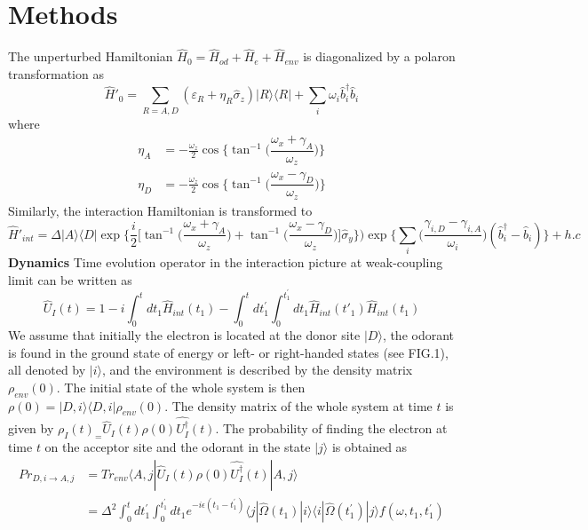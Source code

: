 \documentclass[aps,prl,tightenlines,onecolumn,superscriptaddress]{revtex4}
\begin{document}
\section{Methods}
 The unperturbed Hamiltonian $\hat H_{0}=\hat{H}_{od}+\hat{H}_{e}+\hat{H}_{env}$ is diagonalized by a polaron transformation as~\cite{Tir}
\begin{equation}\label{MI1}
\hat H'_{0}=\sum_{R=A,D}(\varepsilon_{R}+\eta_{R}\hat{\sigma}_{z})|R\rangle\langle R|+\sum_{i}\omega_{i}\hat b_{i}^{\dag}\hat b_{i}
\end{equation}
where
\begin{align}\label{MI2}
 \eta_{A}&=-\frac{\omega_{z}}{2}\cos\big\{\tan^{-1}\big(\dfrac{\omega_{x}+\gamma_{A}}{\omega_{z}}\big)\big\}\nonumber\\
 \eta_{D}&=-\frac{\omega_{z}}{2}\cos\big\{\tan^{-1}\big(\dfrac{\omega_{x}-\gamma_{D}}{\omega_{z}}\big)\big\}
\end{align}
Similarly, the interaction Hamiltonian is transformed to
\begin{equation}\label{MI3}
\hat H'_{int}=\Delta |A\rangle\langle D|\exp\Big\{\dfrac{i}{2}\big[\tan^{-1}\big(\dfrac{\omega_{x}+\gamma_{A}}{\omega_{z}}\big)+
\tan^{-1}\big(\dfrac{\omega_{x}-\gamma_{D}}{\omega_{z}}\big)\big]\hat\sigma_{y}\Big\})\exp\Big\{\sum_{i}\big(\dfrac{\gamma_{i,D}-\gamma_{i,A}}{\omega_{i}}\big)(\hat b_{i}^{\dag}-\hat b_{i})\Big\}+ h.c
\end{equation}
{\bf Dynamics} Time evolution operator in the interaction picture at weak-coupling limit can be written as
\begin{equation}\label{MII1}
\hat{U}_{I}(t)=1-i \int_{0}^{t}dt_{1}\hat{H}_{int}(t_{1})-\int_{0}^{t}dt^{\prime}_{1}\int_{0}^{t^{\prime}_{1}}dt_{1}\hat{H}_{int}(t'_{1})\hat{H}_{int}(t_{1})
\end{equation}
We assume that initially the electron is located at the donor site $|D\rangle$, the odorant is found in the ground state of energy or left- or right-handed states (see FIG.1), all denoted by $|i\rangle$, and the environment is described by the density matrix $\rho_{env}(0)$. The initial state of the whole system is then $\rho(0)=|D,i\rangle\langle D,i|\rho_{env}(0)$. The density matrix of the whole system at time $t$ is given by $\rho_{I}(t)_=\hat{U}_{I}(t)\rho(0)\hat{U_{I}^{\dag}}(t)$. The probability of finding the electron at time $t$ on the acceptor site and the odorant in the state $|j\rangle$ is obtained as
\begin{align}\label{MII2}
Pr_{D,i\rightarrow A,j}&=Tr_{env}\langle A,j| \hat{U}_{I}(t)\rho(0)\hat{U_{I}^{\dag}}(t)|A,j\rangle\nonumber\\
&=\Delta^{2}\int_{0}^{t}dt^{\prime}_{1}\int_{0}^{t^{\prime}_{1}}dt_{1} e^{-i\epsilon(t_{1}-t^{\prime}_{1})}\langle j|\hat\Omega{(t_{1})}|i\rangle \langle i|\hat\Omega{(t^{\prime}_{1})}|j\rangle f(\omega, t_{1},t^{\prime}_{1})
\end{align}
\end{document}
